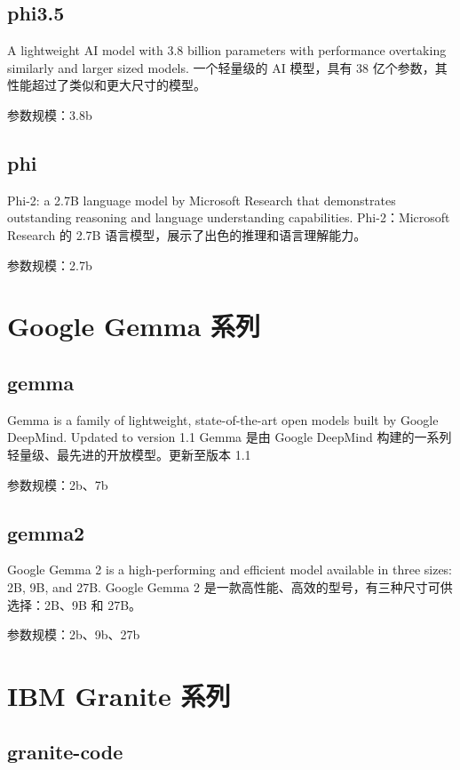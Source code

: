 \documentclass[12pt,UTF8]{ctexbook}
\begin{document}
\subsection{phi3.5}

A lightweight AI model with 3.8 billion parameters with performance overtaking similarly and larger sized models.
一个轻量级的 AI 模型，具有 38 亿个参数，其性能超过了类似和更大尺寸的模型。

参数规模：3.8b

\subsection{phi}

Phi-2: a 2.7B language model by Microsoft Research that demonstrates outstanding reasoning and language understanding capabilities.
Phi-2：Microsoft Research 的 2.7B 语言模型，展示了出色的推理和语言理解能力。

参数规模：2.7b

\section{Google Gemma 系列}

\subsection{gemma}

Gemma is a family of lightweight, state-of-the-art open models built by Google DeepMind. Updated to version 1.1
Gemma 是由 Google DeepMind 构建的一系列轻量级、最先进的开放模型。更新至版本 1.1

参数规模：2b、7b

\subsection{gemma2}

Google Gemma 2 is a high-performing and efficient model available in three sizes: 2B, 9B, and 27B.
Google Gemma 2 是一款高性能、高效的型号，有三种尺寸可供选择：2B、9B 和 27B。

参数规模：2b、9b、27b

\section{IBM Granite 系列}

\subsection{granite-code}
\end{document}
